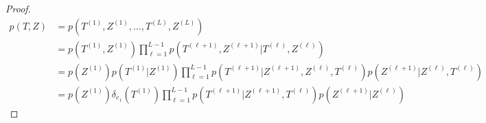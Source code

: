 \begin{proof}

    $$
    \begin{align}
        p(T, Z) &= p(T^{(1)}, Z^{(1)}, \dots, T^{(L)}, Z^{(L)}) \\
                &= p(T^{(1)}, Z^{(1)}) \prod_{\ell = 1}^{L-1} p(T^{(\ell+1)}, Z^{(\ell+1)} | T^{(\ell)}, Z^{(\ell)}) \\
                &= p(Z^{(1)}) p(T^{(1)} | Z^{(1)}) \prod_{\ell=1}^{L-1} p(T^{(\ell+1)} | Z^{(\ell+1)}, Z^{(\ell)}, T^{(\ell)}) p(Z^{(\ell+1)} | Z^{(\ell)}, T^{(\ell)}) \\
                &= p(Z^{(1)}) \delta_{e_1}(T^{(1)}) \prod_{\ell=1}^{L-1} p(T^{(\ell+1)} | Z^{(\ell+1)}, T^{(\ell)}) p(Z^{(\ell+1)} | Z^{(\ell)})
    \end{align}
    $$

\end{proof}

